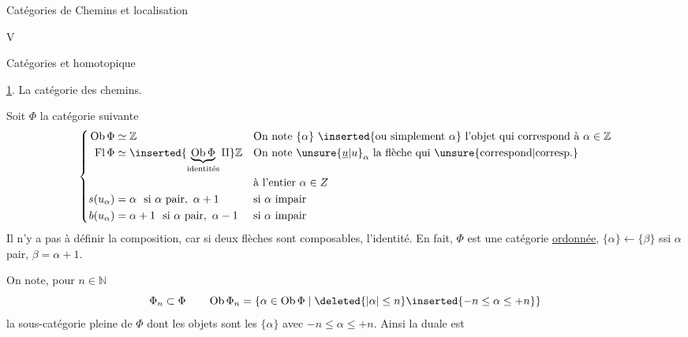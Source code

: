 Catégories de Chemins et localisation

V

Catégories  et  homotopique

\uline{1}. La catégorie des chemins.

Soit $\Phi$ la catégorie suivante
\[
\left\{\begin{aligned}
\operatorname{Ob}\Phi &\simeq \mathbb Z &&\text{On note }\{\alpha\}\ \inserted{\text{ou simplement }\alpha}\ \text{l'objet qui correspond à }\alpha\in\mathbb Z\\
\operatorname{Fl}\Phi &\simeq \inserted{\underbrace{\operatorname{Ob}\Phi}_{\text{identités}}\amalg}\mathbb Z &&\text{On note }\unsure{\underline{u}|u}_{\alpha}\ \text{la flèche qui \unsure{correspond|corresp.}}\\
&&&\text{à l'entier }\alpha\in Z\\
s(u_\alpha)&=\alpha\ \text{ si }\alpha\text{ pair},\ \alpha+1 &&\text{si }\alpha\text{ impair}\\
b(u_\alpha)&=\alpha+1\ \text{ si }\alpha\text{ pair},\ \alpha-1 &&\text{si }\alpha\text{ impair}
\end{aligned}\right.
\]
Il n'y a pas à définir la composition, car si deux flèches sont composables,  l'identité. En fait, $\Phi$ est une catégorie \uline{ordonnée}, $\{\alpha\}\leftarrow\{\beta\}$ ssi $\alpha$ pair, $\beta=\alpha+1$.

On  note, pour $n\in\mathbb N$
\[
\Phi_n\subset\Phi\qquad \operatorname{Ob}\Phi_n=\{\alpha\in\operatorname{Ob}\Phi\mid\deleted{|\alpha|\leq n}\inserted{-n\leq\alpha\leq+n}\}
\]
la sous-catégorie pleine de $\Phi$ dont les objets sont les $\{\alpha\}$ avec $-n\leq\alpha\leq+n$. Ainsi
la duale est

